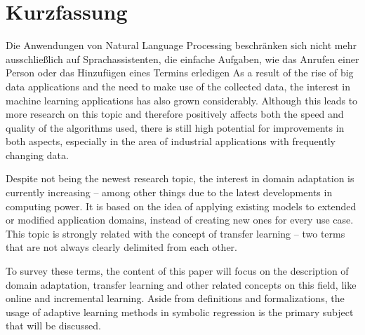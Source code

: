 \chapter{Kurzfassung}
Die Anwendungen von Natural Language Processing beschränken sich nicht mehr ausschließlich auf Sprachassistenten, die einfache Aufgaben, wie das Anrufen einer Person oder das Hinzufügen eines Termins erledigen
As a result of the rise of big data applications and the need to make use of the collected data, the interest in machine learning applications has also grown considerably. Although this leads to more research on this topic and therefore positively affects both the speed and quality of the algorithms used, there is still high potential for improvements in both aspects, especially in the area of industrial applications with frequently changing data. 

Despite not being the newest research topic, the interest in domain adaptation is currently increasing -- among other things due to the latest developments in computing power. It is based on the idea of applying existing models to extended or modified application domains, instead of creating new ones for every use case. This topic is strongly related with the concept of transfer learning -- two terms that are not always clearly delimited from each other. \cite{Pan2010} \cite{Haslam2016}

To survey these terms, the content of this paper will focus on the description of domain adaptation, transfer learning and other related concepts on this field, like online and incremental learning. Aside from definitions and formalizations, the usage of adaptive learning methods in symbolic regression is the primary subject that will be discussed.


